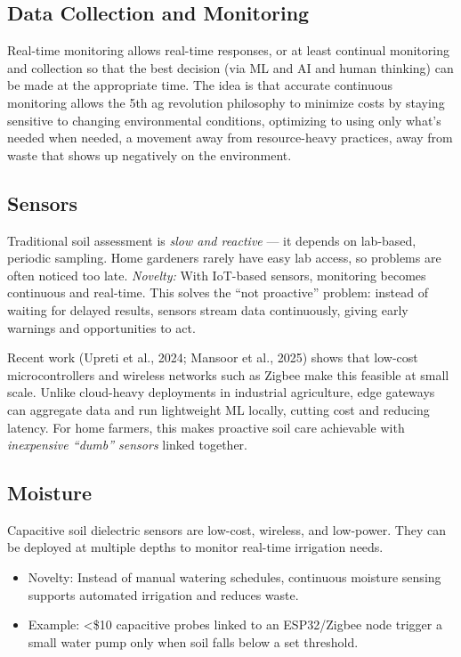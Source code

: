 \documentclass{sigchi}
\begin{document}
\subsection{Data Collection and Monitoring}

Real-time monitoring allows real-time responses, or at least continual monitoring and collection so that the best decision (via ML  and  AI  and  human thinking) can be made at the appropriate time. The idea is that accurate continuous monitoring allows the 5th ag revolution philosophy to minimize costs by staying sensitive to changing environmental conditions, optimizing to using only what's needed when needed, a movement away from resource-heavy practices, away from waste that shows up negatively on the environment.

\subsection{Sensors}

Traditional soil assessment is \emph{slow and reactive} — it depends on lab-based, periodic sampling. Home gardeners rarely have easy lab access, so problems are often noticed too late.
\emph{Novelty:} With IoT-based sensors, monitoring becomes continuous and real-time. This solves the “not proactive” problem: instead of waiting for delayed results, sensors stream data continuously, giving early warnings and opportunities to act.

Recent work (Upreti et al., 2024; Mansoor et al., 2025) shows that low-cost microcontrollers and wireless networks such as Zigbee make this feasible at small scale. Unlike cloud-heavy deployments in industrial agriculture, edge gateways can aggregate data and run lightweight ML locally, cutting cost and reducing latency. For home farmers, this makes proactive soil care achievable with \emph{inexpensive “dumb” sensors} linked together.

\subsection{Moisture}
Capacitive soil dielectric sensors are low-cost, wireless, and low-power. They can be deployed at multiple depths to monitor real-time irrigation needs.
\begin{itemize}
	\item Novelty: Instead of manual watering schedules, continuous moisture sensing supports automated irrigation and reduces waste.
	\item Example: <\$10 capacitive probes linked to an ESP32/Zigbee node trigger a small water pump only when soil falls below a set threshold.
\end{itemize}
\end{document}
